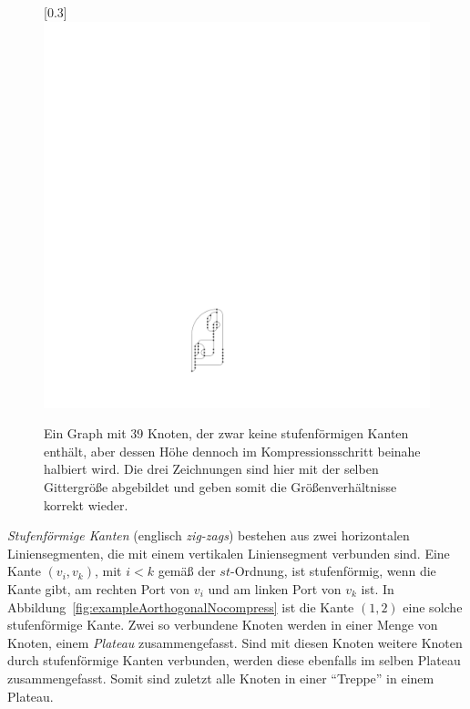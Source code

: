 \documentclass[a4paper]{scrreprt}
\theoremstyle{definition}
\begin{document}
\begin{figure}[h]
        \quad
       [0.3\textwidth]
            {\includegraphics[scale=.7]{compressableGraph/isSmooth}}
 
 
        \caption{Ein Graph mit 39 Knoten, der zwar keine stufenförmigen Kanten enthält, aber dessen Höhe dennoch im Kompressionsschritt beinahe halbiert wird. Die drei Zeichnungen sind hier mit der selben Gittergröße abgebildet und geben somit die Größenverhältnisse korrekt wieder.}
        \label{fig:orthognalCompress}
\end{figure}

\emph{Stufenförmige Kanten} (englisch \emph{zig-zags}) bestehen aus zwei horizontalen Liniensegmenten, die mit einem vertikalen Liniensegment verbunden sind. Eine Kante $(v_i, v_k)$, mit $i < k$ gemäß der $st$-Ordnung, ist stufenförmig, wenn die Kante gibt, am rechten Port von $v_i$ und am linken Port von $v_k$ ist. In Abbildung~\ref{fig:exampleAorthogonalNocompress} ist die Kante $(1,2)$ eine solche stufenförmige Kante. Zwei so verbundene Knoten werden in einer Menge von Knoten, einem \emph{Plateau} zusammengefasst. Sind mit diesen Knoten weitere Knoten durch stufenförmige Kanten verbunden, werden diese ebenfalls im selben Plateau zusammengefasst. Somit sind zuletzt alle Knoten in einer "`Treppe"' in einem Plateau.
\end{document}
